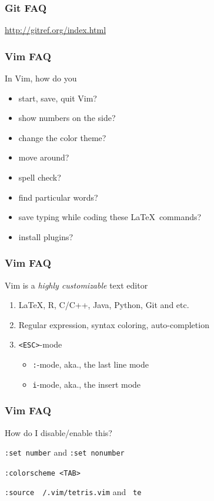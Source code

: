 \documentclass[hyperref={colorlinks=false},handout,10pt]{beamer}
\let\olditem\item
\renewcommand{\item}{\setlength{\itemsep}{0.5\baselineskip}\olditem}
\begin{document}
\begin{frame}
    \frametitle{Git FAQ}
    \begin{center}
        \href{http://gitref.org/index.html}{http://gitref.org/index.html}
    \end{center}
\end{frame}

\begin{frame}
    \frametitle{Vim FAQ}
    In Vim, how do you
    \begin{itemize}
        \item start, save, quit Vim? 
        \item show numbers on the side?
        \item change the color theme?
        \item move around?
        \item spell check?
        \item find particular words?
        \item save typing while coding these \LaTeX\ commands?
        \item install plugins?
    \end{itemize}
\end{frame}

\begin{frame}
    \frametitle{Vim FAQ}
    \begin{block}
        {Vim is a \emph{highly customizable} text editor}
    \vskip0.1in
    \begin{enumerate}
        \item \LaTeX, R, C/C++, Java, Python, Git and etc.
        \item Regular expression, syntax coloring, auto-completion
        \item \texttt{<ESC>}-mode
        \begin{itemize}
            \item \texttt{:}-mode, aka., the last line mode
            \item \texttt{i}-mode, aka., the insert mode
        \end{itemize}
    \end{enumerate}
    \end{block}
\end{frame}

\begin{frame}
    \frametitle{Vim FAQ}
    \begin{block}{How do I disable/enable this?}
        \begin{description}
            \item[number column] \texttt{:set number} and \texttt{:set nonumber}
            \item[colorscheme] \texttt{:colorscheme <TAB>} 
            \item[tetris] \texttt{:source ~/.vim/tetris.vim} and \texttt{\ te}
        \end{description}
    \end{block}
    
\end{frame}
\end{document}

